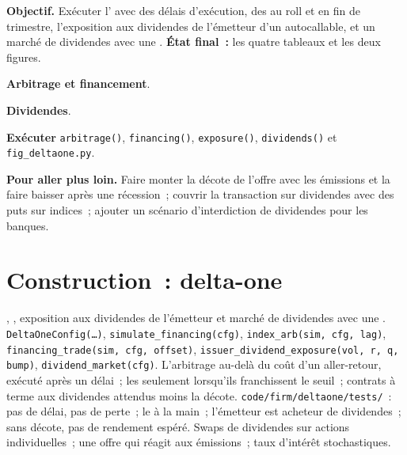 \begin{tutorial}
\textbf{Objectif.} Exécuter l' avec des délais d'exécution, des  au roll et en fin de trimestre, l'exposition aux dividendes de l'émetteur d'un
autocallable, et un marché de dividendes avec une . \textbf{État final~:} les quatre tableaux et les deux figures.
\begin{tutsteps}
\item \textbf{Arbitrage et financement}.
\label{lst:s2:delta-one-and-dividends:arb}
\item \textbf{Dividendes}.
\label{lst:s2:delta-one-and-dividends:div}
\item \textbf{Exécuter} \texttt{arbitrage()}, \texttt{financing()}, \texttt{exposure()}, \texttt{dividends()} et \texttt{fig\_deltaone.py}.
\end{tutsteps}
\textbf{Pour aller plus loin.} Faire monter la décote de l'offre avec les émissions et la faire baisser après une récession~; couvrir la transaction sur dividendes avec des puts sur indices~; ajouter un
scénario d'interdiction de dividendes pour les banques.
\end{tutorial}

\section{Construction~: delta-one}\label{bld:s2:delta-one-and-dividends:deltaone}

\begin{build}
 , , exposition aux dividendes de l'émetteur et marché de dividendes avec une .
 \texttt{DeltaOneConfig(\dots)}, \texttt{simulate\_financing(cfg)}, \texttt{index\_arb(sim, cfg, lag)},
\texttt{financing\_trade(sim, cfg, offset)}, \texttt{issuer\_dividend\_exposure(vol, r, q, bump)}, \texttt{dividend\_market(cfg)}.
 L'arbitrage au-delà du coût d'un aller-retour, exécuté après un délai~; les  seulement lorsqu'ils franchissent le seuil~; contrats à terme aux
dividendes attendus moins la décote.
 \texttt{code/firm/deltaone/tests/}~: pas de délai, pas de perte~; le  à la main~; l'émetteur est acheteur de dividendes~; sans décote,
pas de rendement espéré.
 Swaps de dividendes sur actions individuelles~; une offre qui réagit aux émissions~; taux d'intérêt stochastiques.
\end{build}

